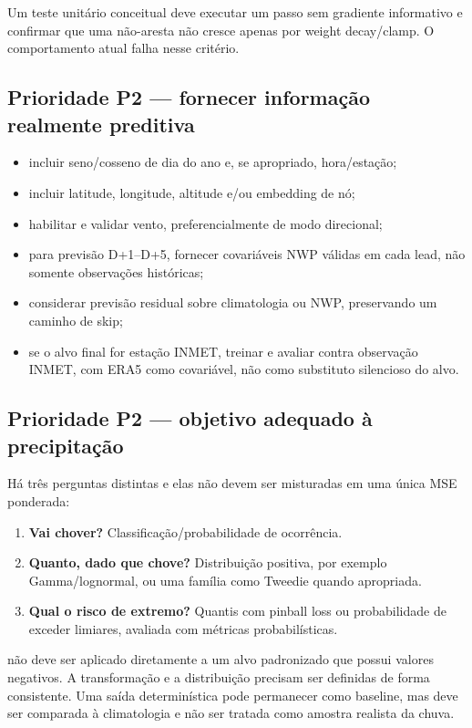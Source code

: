 \documentclass[11pt,a4paper]{article}
\newcommand{\code}[1]{\texttt{\detokenize{#1}}}
\begin{document}
Um teste unitário conceitual deve executar um passo sem gradiente informativo e confirmar que
uma não-aresta não cresce apenas por weight decay/clamp. O comportamento atual falha nesse
critério.

\subsection{Prioridade P2 --- fornecer informação realmente preditiva}

\begin{itemize}
  \item incluir seno/cosseno de dia do ano e, se apropriado, hora/estação;
  \item incluir latitude, longitude, altitude e/ou embedding de nó;
  \item habilitar e validar vento, preferencialmente de modo direcional;
  \item para previsão D+1--D+5, fornecer covariáveis NWP válidas em cada lead, não somente
  observações históricas;
  \item considerar previsão residual sobre climatologia ou NWP, preservando um caminho de skip;
  \item se o alvo final for estação INMET, treinar e avaliar contra observação INMET, com ERA5
  como covariável, não como substituto silencioso do alvo.
\end{itemize}

\subsection{Prioridade P2 --- objetivo adequado à precipitação}

Há três perguntas distintas e elas não devem ser misturadas em uma única MSE ponderada:

\begin{enumerate}
  \item \textbf{Vai chover?} Classificação/probabilidade de ocorrência.
  \item \textbf{Quanto, dado que chove?} Distribuição positiva, por exemplo Gamma/lognormal, ou
  uma família como Tweedie quando apropriada.
  \item \textbf{Qual o risco de extremo?} Quantis com pinball loss ou probabilidade de exceder
  limiares, avaliada com métricas probabilísticas.
\end{enumerate}

\code{Softplus} não deve ser aplicado diretamente a um alvo padronizado que possui valores
negativos. A transformação e a distribuição precisam ser definidas de forma consistente. Uma
saída determinística pode permanecer como baseline, mas deve ser comparada à climatologia e não
ser tratada como amostra realista da chuva.
\end{document}

